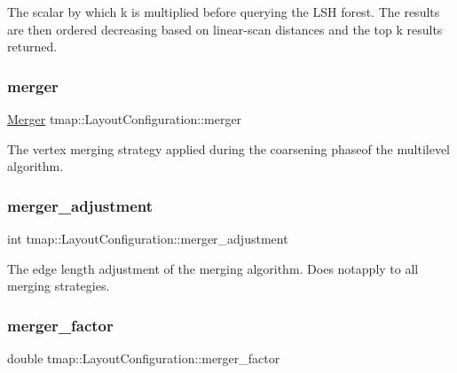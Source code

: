 The scalar by which k is multiplied before querying the L\+SH forest. The results are then ordered decreasing based on linear-\/scan distances and the top k results returned. \mbox{\label{structtmap_1_1LayoutConfiguration_aeee45308fd8dbda38fbc7b8c7ff9212f}} 
\subsubsection{\texorpdfstring{merger}{merger}}
{\footnotesize\ttfamily \hyperlink{layout_8hh_a8c7bb9956a1a724233182a166cfdc0ff}{Merger} tmap\+::\+Layout\+Configuration\+::merger}

The vertex merging strategy applied during the coarsening phaseof the multilevel algorithm. \mbox{\label{structtmap_1_1LayoutConfiguration_a16109420c8ec0a4c3021345fd943daf6}} 
\subsubsection{\texorpdfstring{merger\+\_\+adjustment}{merger\_adjustment}}
{\footnotesize\ttfamily int tmap\+::\+Layout\+Configuration\+::merger\+\_\+adjustment}

The edge length adjustment of the merging algorithm. Does notapply to all merging strategies. \mbox{\label{structtmap_1_1LayoutConfiguration_a72fe4f8f738d2d400f70db97c4273a46}} 
\subsubsection{\texorpdfstring{merger\+\_\+factor}{merger\_factor}}
{\footnotesize\ttfamily double tmap\+::\+Layout\+Configuration\+::merger\+\_\+factor}

